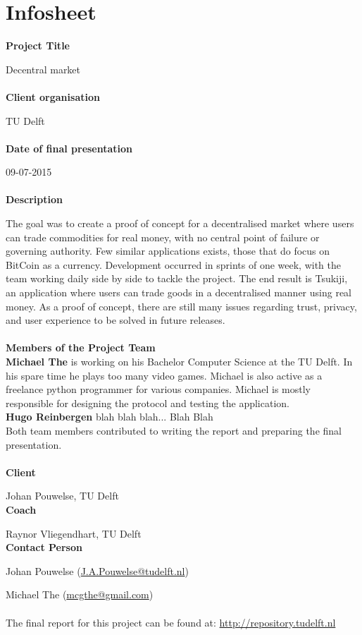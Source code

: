 \section{Infosheet}

\textbf{Project Title}

Decentral market
\\
\\
\textbf{Client organisation}

TU Delft
\\
\\
\textbf{Date of final presentation}

09-07-2015
\\
\\
\textbf{Description}

The goal was to create a proof of concept for a decentralised market where users can trade commodities for real money, with no central point of failure or governing authority.
Few similar applications exists, those that do focus on BitCoin as a currency.
Development occurred in sprints of one week, with the team working daily side by side to tackle the project.
The end result is Tsukiji, an application where users can trade goods in a decentralised manner using real money.
As a proof of concept, there are still many issues regarding trust, privacy, and user experience to be solved in future releases.
\\
\\
\textbf{Members of the Project Team}
\\

\textbf{Michael The} is working on his Bachelor Computer Science at the TU Delft.
In his spare time he plays too many video games.
Michael is also active as a freelance python programmer for various companies.
Michael is mostly responsible for designing the protocol and testing the application.
\\

\textbf{Hugo Reinbergen} blah blah blah...
Blah
Blah
\\

Both team members contributed to writing the report and preparing the final presentation.
\\
\\
\textbf{Client}

Johan Pouwelse, TU Delft
\\
\textbf{Coach}

Raynor Vliegendhart, TU Delft
\\
\textbf{Contact Person}

Johan Pouwelse (\href{mailto:J.A.Pouwelse@tudelft.nl}{J.A.Pouwelse@tudelft.nl})

Michael The	(\href{mailto:mcgthe@gmail.com}{mcgthe@gmail.com})
\\
\\
The final report for this project can be found at: \url{http://repository.tudelft.nl}